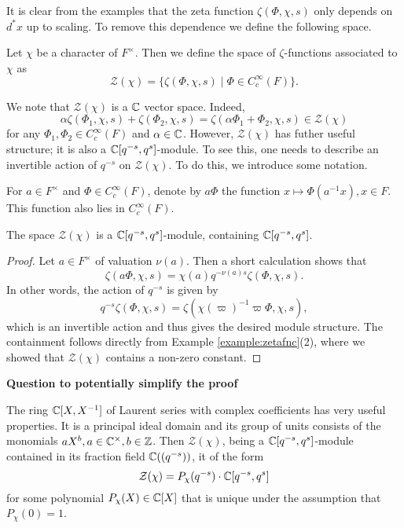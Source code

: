 It is clear from the examples that the zeta function $\zeta(\Phi,\chi,s)$ only depends on $d^*x$ up to scaling. To remove this dependence we define the following space.

\begin{defn}
    Let $\chi$ be a character of $F^\times$. Then we define the space of $\zeta$-functions associated to $\chi$ as
    $$\mathcal Z(\chi) = \{\zeta(\Phi,\chi,s) \mid \Phi \in C_c^\infty(F)\}.$$
\end{defn}

We note that $\mathcal{Z}(\chi)$ is a $\mathbb{C}$ vector space. Indeed, $$\alpha\zeta(\Phi_1,\chi,s)+\zeta(\Phi_2,\chi,s)=\zeta(\alpha\Phi_1+\Phi_2,\chi,s)\in\mathcal{Z}(\chi)$$
for any $\Phi_1,\Phi_2\in C_c^\infty(F)$ and $\alpha\in\mathbb{C}$. However, $\mathcal{Z}(\chi)$ has futher useful structure; it is also a $\mathbb{C}[q^{-s},q^s]$-module. To see this, one needs to describe an invertible action of $q^{-s}$ on $\mathcal{Z}(\chi)$. To do this, we introduce some notation.

\begin{notn}
    For $a \in F^\times$ and $\Phi \in C_c^\infty(F)$, denote by $a\Phi$ the function $x \mapsto \Phi(a^{-1}x),x\in F$. This function also lies in $C_c^\infty(F)$.
\end{notn}

\begin{lemma}\label{lem:ZmodGL1}
    The space $\mathcal Z(\chi)$ is a $\mathbb{C}[q^{-s},q^s]$-module, containing $\mathbb{C}[q^{-s},q^s]$.
\end{lemma}
\begin{proof}
    Let $a \in F^\times$ of valuation $\nu(a)$. Then a short calculation shows that
    $$\zeta(a\Phi,\chi,s) = \chi(a)q^{-\nu(a)s}\zeta(\Phi,\chi,s).$$
    In other words, the action of $q^{-s}$ is given by 
    $$q^{-s}\zeta(\Phi,\chi,s)=\zeta(\chi(\varpi)^{-1}\varpi\Phi,\chi,s),$$
    which is an invertible action and thus gives the desired module structure. The containment follows directly from Example \ref{example:zetafnc}(2), where we showed that $\mathcal{Z}(\chi)$ contains a non-zero constant.
\end{proof}

\iffalse
\textbf{Question to potentially simplify the proof}

The ring $\mathbb{C}[X,X^{-1}]$ of Laurent series with complex coefficients has very useful properties. It is a principal ideal domain and its group of units consists of the monomials $aX^b,a\in\mathbb{C}^\times, b\in\mathbb{Z}$. Then $\mathcal Z(\chi)$, being a $\mathbb{C}[q^{-s},q^s]$-module contained in its fraction field $\mathbb{C}((q^{-s}))$, it of the form 
$$\mathcal{Z}(\chi)=P_\chi(q^{-s})\cdot\mathbb{C}[q^{-s},q^s]$$ for some polynomial $P_\chi(X)\in\mathbb{C}[X]$ that is unique under the assumption that $P_\chi(0)=1$.

